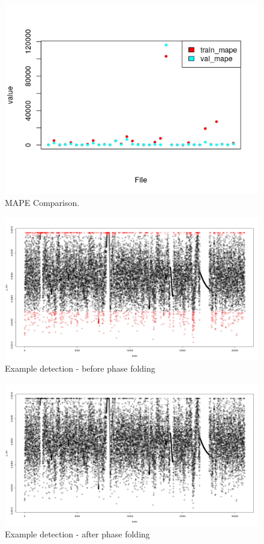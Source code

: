 \documentclass[%
aip,
amsmath,amssymb,
reprint,%
]{revtex4-1}
\begin{document}
\begin{figure}[h!]
	\includegraphics[width=\linewidth]{mape.png}
	\caption{MAPE Comparison.}
	\label{fig:mape}
\end{figure}

\begin{figure}[h!]
	\includegraphics[width=\linewidth]{eg1_before.png}
	\caption{Example detection - before phase folding}
	\label{fig:eg1_before}
\end{figure}

\begin{figure}[h!]
	\includegraphics[width=\linewidth]{eg1_after.png}
	\caption{Example detection - after phase folding}
	\label{fig:eg1_after}
\end{figure}
\end{document}
